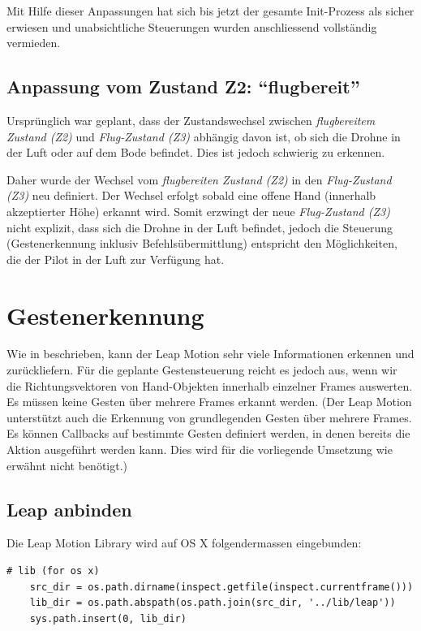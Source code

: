 Mit Hilfe dieser Anpassungen hat sich bis jetzt der gesamte Init-Prozess als sicher erwiesen und unabsichtliche Steuerungen wurden anschliessend vollständig vermieden.

\subsection{Anpassung vom Zustand Z2: "`flugbereit"'}
Ursprünglich war geplant, dass der Zustandswechsel zwischen \textit{flugbereitem Zustand (Z2)} und \textit{Flug-Zustand (Z3)} abhängig davon ist, ob sich die Drohne in der Luft oder auf dem Bode befindet.
Dies ist jedoch schwierig zu erkennen.

Daher wurde der Wechsel vom \textit{flugbereiten Zustand (Z2)} in den \textit{Flug-Zustand (Z3)} neu definiert.
Der Wechsel erfolgt sobald eine offene Hand (innerhalb akzeptierter Höhe) erkannt wird.
Somit erzwingt der neue \textit{Flug-Zustand (Z3)} nicht explizit, dass sich die Drohne in der Luft befindet, jedoch die Steuerung (Gestenerkennung inklusiv Befehlsübermittlung) entspricht den Möglichkeiten, die der Pilot in der Luft zur Verfügung hat.


\section{Gestenerkennung}
Wie in  beschrieben, kann der Leap Motion sehr viele Informationen erkennen und zurückliefern.
Für die geplante Gestensteuerung reicht es jedoch aus, wenn wir die Richtungsvektoren von Hand-Objekten innerhalb einzelner Frames auswerten.
Es müssen keine Gesten über mehrere Frames erkannt werden. (Der Leap Motion unterstützt auch die Erkennung von grundlegenden Gesten über mehrere Frames. Es können Callbacks auf bestimmte Gesten definiert werden, in denen bereits die Aktion ausgeführt werden kann. Dies wird für die vorliegende Umsetzung wie erwähnt nicht benötigt.)

\subsection{Leap anbinden}
Die Leap Motion Library wird auf OS X folgendermassen eingebunden:
\begin{lstlisting}[style=lstStyleCpp]
	# lib (for os x)
	src_dir = os.path.dirname(inspect.getfile(inspect.currentframe()))
	lib_dir = os.path.abspath(os.path.join(src_dir, '../lib/leap'))
	sys.path.insert(0, lib_dir)
\end{lstlisting}

